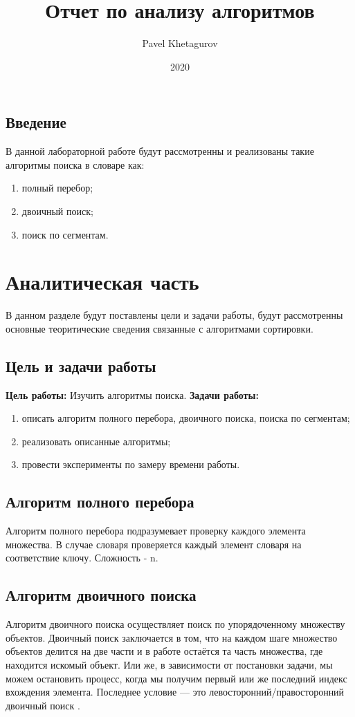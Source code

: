 \documentclass{article}
\title{Отчет по анализу алгоритмов}
\date{2020}
\author{Pavel Khetagurov}
\begin{document}
	
	\newpage
	\tableofcontents
	\newpage
	\begin{center}
	    \section*{Введение}
	\end{center}
		\indent В данной лабораторной работе будут рассмотренны и реализованы такие алгоритмы поиска в словаре как:
		\begin{enumerate}
		\item полный перебор;
		\item двоичный поиск;
		\item поиск по сегментам.
		\end{enumerate}
	\newpage
	\section{Аналитическая часть}
	В данном разделе будут поставлены цели и задачи работы, будут рассмотренны основные теоритические сведения связанные с алгоритмами сортировки.
		\subsection{Цель и задачи работы}
			\textbf{Цель работы:} Изучить алгоритмы поиска.
			\newline 
			\indent \textbf{Задачи работы:}
			\begin{enumerate}
				\item описать алгоритм полного перебора, двоичного поиска, поиска по сегментам;
				\item реализовать описанные алгоритмы;
				\item провести эксперименты по замеру времени работы.
			\end{enumerate}

		\subsection{Алгоритм полного перебора}
		Алгоритм полного перебора подразумевает проверку каждого элемента множества.  В случае словаря проверяется каждый элемент словаря на соответствие ключу.
Сложность - n.
		\subsection{Алгоритм двоичного поиска}
		Алгоритм двоичного поиска осуществляет поиск по упорядоченному множеству объектов. \newline
		\indent Двоичный поиск заключается в том, что на каждом шаге множество объектов делится на две части и в работе остаётся та часть множества, где находится искомый объект. Или же, в зависимости от постановки задачи, мы можем остановить процесс, когда мы получим первый или же последний индекс вхождения элемента. Последнее условие — это левосторонний/правосторонний двоичный поиск \cite{binary-search}.
\end{document}
